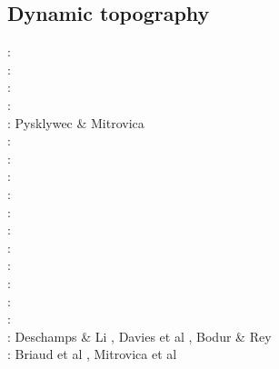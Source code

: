 \subsection{Dynamic topography} 

\begin{scriptsize}
\nineteeneightyfive: \cite{hacr85}\\
\nineteeneightyseven: \cite{repa87}\\
\nineteenninetytwo: \cite{kiha92}\\
\nineteenninetythree: \cite{gurn93}\cite{gurn93b}\\
\nineteenninetyseven: Pysklywec \& Mitrovica \cite{pymi97}\\
\nineteenninetynine: \cite{bumo99}\\
\twothousandthree: \cite{cogu03}\\
\twothousandnine: \cite{cohu09}\\
\twothousandten: \cite{bofb10}\cite{brau10}\cite{stfh10}\cite{shml10}\\
\twothousandeleven: \cite{rapy11}\\
\twothousandtwelve: \cite{shlm12}\cite{zhzf12}\\
\twothousandthirteen: \cite{brrs13}\cite{flgm13}\\
\twothousandfifteen: \cite{aupm15}\cite{kiff15}\cite{dali15}\\
\twothousandsixteen: \cite{howa16}\cite{gvfb16}\cite{yagu16}\cite{stei16}\cite{cogb16}\\
\twothousandseventeen: \cite{yamm17}\cite{aumh17}\cite{grrb17}\\
\twothousandeighteen: \cite{osss18}\cite{vibc18}\\
\twothousandnineteen: Deschamps \& Li \cite{deli19}, Davies et al \cite{davk19}, Bodur \& Rey \cite{bore19}\\
\twothousandtwenty: Briaud et al \cite{braf20}, Mitrovica et al \cite{miac20}
\end{scriptsize}




